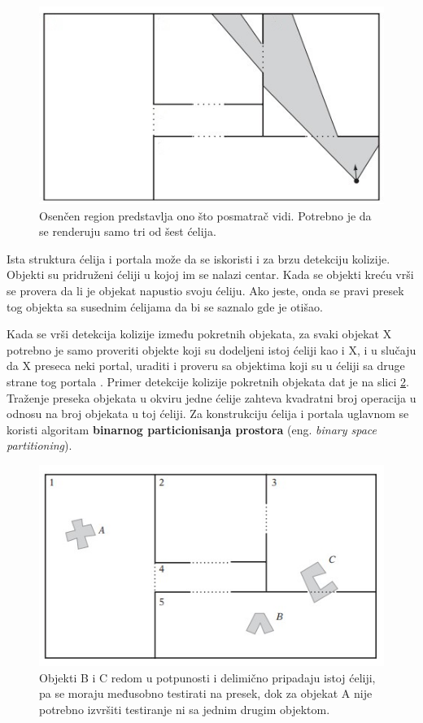 \documentclass[12pt,oneside]{memoir}
\begin{document}
\begin{figure}[h!]
	\begin{center}
	\includegraphics[scale=1]{cellsRooms.jpg}
	\end{center}
	\caption{
	Osenčen region predstavlja ono što posmatrač vidi. 
	Potrebno je da se renderuju samo tri od šest ćelija. }
	\label{fig:cellsRooms}
\end{figure}

Ista struktura ćelija i portala može da se iskoristi i za brzu detekciju kolizije. 
Objekti su pridruženi ćeliji u kojoj im se nalazi centar. Kada se objekti kreću vrši 
se provera da li je objekat napustio svoju ćeliju. Ako jeste, onda se pravi presek tog objekta
sa susednim ćelijama da bi se saznalo gde je otišao. 

Kada se vrši detekcija kolizije između pokretnih objekata, za svaki objekat X 
potrebno je samo proveriti objekte koji su dodeljeni istoj ćeliji kao i X, i u slučaju
da X preseca neki portal, uraditi i proveru sa objektima koji su u ćeliji sa druge strane tog portala \cite{cells}.
Primer detekcije kolizije pokretnih objekata dat je na slici \ref{fig:cellsObj}.
Traženje preseka objekata u okviru jedne ćelije zahteva kvadratni broj operacija u odnosu na broj objekata u toj ćeliji.
Za konstrukciju ćelija i portala uglavnom se koristi algoritam 
\textbf{binarnog particionisanja prostora} (eng. {\em binary space partitioning}).

\begin{figure}[h!]
	\begin{center}
	\includegraphics[scale=1]{cellsObj.jpg}
	\end{center}
	\caption{ Objekti B i C redom u potpunosti i delimično pripadaju istoj ćeliji, pa se moraju međusobno testirati na presek,
	 dok za objekat A nije potrebno izvršiti testiranje ni sa jednim drugim objektom. }
	\label{fig:cellsObj}
\end{figure}
\end{document}
